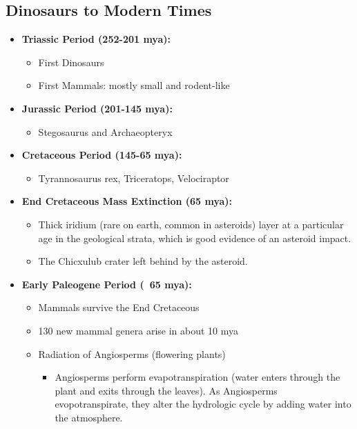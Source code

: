 \documentclass[12pt]{article}
\begin{document}
\subsection{Dinosaurs to Modern Times}

\begin{itemize}
    \item \textbf{Triassic Period (252-201 mya):}
          \begin{itemize}
              \item First Dinosaurs
              \item First Mammals: mostly small and rodent-like
          \end{itemize}
    \item \textbf{Jurassic Period (201-145 mya):}
          \begin{itemize}
              \item Stegosaurus and Archaeopteryx
          \end{itemize}
    \item \textbf{Cretaceous Period (145-65 mya):}
          \begin{itemize}
              \item Tyrannosaurus rex, Triceratops, Velociraptor
          \end{itemize}
    \item \textbf{End Cretaceous Mass Extinction (65 mya):}
          \begin{itemize}
              \item Thick iridium (rare on earth, common in asteroids) layer at a particular age in the geological strata, which is good evidence of an asteroid impact.
              \item The Chicxulub crater left behind by the asteroid.
          \end{itemize}
    \item \textbf{Early Paleogene Period (~65 mya):}
    \begin{itemize}
        \item Mammals survive the End Cretaceous
        \item 130 new mammal genera arise in about 10 mya
        \item Radiation of Angiosperms (flowering plants)
        \begin{itemize}
            \item Angiosperms perform evapotranspiration (water enters through the plant and exits through the leaves). As Angiosperms evopotranspirate, they alter the hydrologic cycle by adding water into the atmosphere.

\end{itemize}
\end{itemize}
\end{itemize}
\end{document}
